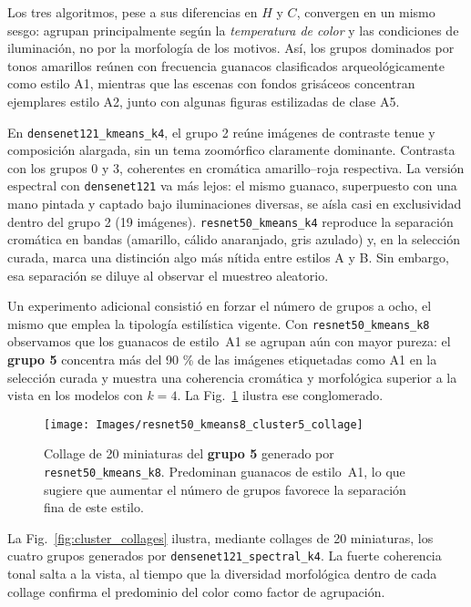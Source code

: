 Los tres algoritmos, pese a sus diferencias en $H$ y $C$, convergen en un mismo sesgo: agrupan principalmente según la \emph{temperatura de color} y las condiciones de iluminación, no por la morfología de los motivos.
Así, los grupos dominados por tonos amarillos reúnen con frecuencia guanacos clasificados arqueológicamente como estilo A1, mientras que las escenas con fondos grisáceos concentran ejemplares estilo A2, junto con algunas figuras estilizadas de clase A5.

En \texttt{densenet121\_kmeans\_k4}, el grupo 2 reúne imágenes de contraste tenue y composición alargada, sin un tema zoomórfico claramente dominante.
Contrasta con los grupos 0 y 3, coherentes en cromática amarillo–roja respectiva.
La versión espectral con \texttt{densenet121} va más lejos: el mismo guanaco, superpuesto con una mano pintada y captado bajo iluminaciones diversas, se aísla casi en exclusividad dentro del grupo 2 (19 imágenes).
\texttt{resnet50\_kmeans\_k4} reproduce la separación cromática en bandas (amarillo, cálido anaranjado, gris azulado) y, en la selección curada, marca una distinción algo más nítida entre estilos A y B.
Sin embargo, esa separación se diluye al observar el muestreo aleatorio.

Un experimento adicional consistió en forzar el número de grupos a ocho, el mismo que emplea la tipología estilística vigente.
Con \texttt{resnet50\_kmeans\_k8} observamos que los guanacos de estilo~A1 se agrupan aún con mayor pureza: el \textbf{grupo 5} concentra más del 90 \% de las imágenes etiquetadas como A1 en la selección curada y muestra una coherencia cromática y morfológica superior a la vista en los modelos con $k=4$.
La Fig.~\ref{fig:r50k8_cluster5} ilustra ese conglomerado.

\begin{figure}[!h]
  \centering
  \texttt{[image: Images/resnet50\_kmeans8\_cluster5\_collage]}
  \caption{Collage de 20 miniaturas del \textbf{grupo 5} generado por \texttt{resnet50\_kmeans\_k8}.
  Predominan guanacos de estilo~A1, lo que sugiere que aumentar el número de grupos favorece la separación fina de este estilo.}
  \label{fig:r50k8_cluster5}
\end{figure}

La Fig.~\ref{fig:cluster_collages} ilustra, mediante collages de 20 miniaturas, los cuatro grupos generados por \texttt{densenet121\_spectral\_k4}.
La fuerte coherencia tonal salta a la vista, al tiempo que la diversidad morfológica dentro de cada collage confirma el predominio del color como factor de agrupación.

